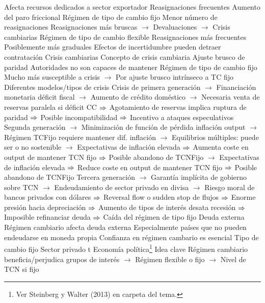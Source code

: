 \documentclass{nuevotema}
\begin{document}
\begin{esquemal}
				\4[] Afecta recursos dedicados a sector exportador
				\4 Reasignaciones frecuentes
				\4[] Aumento del paro friccional
				\4 Régimen de tipo de cambio fijo
				\4[] Menor número de reasignaciones
				\4[] Reasignaciones más bruscas
				\4[] $\to$ Devaluaciones
				\4[] $\to$ Crisis cambiarias
				\4 Régimen de tipo de cambio flexible
				\4[] Reasignaciones más frecuentes
				\4[] Posiblemente más graduales
				\4[] Efectos de incertidumbre pueden detraer contratación
			\3 Crisis cambiarias
				\4 Concepto de crisis cambiaria
				\4[] Ajuste brusco de paridad
				\4[] Autoridades no son capaces de mantener
				\4 Régimen de tipo de cambio fijo
				\4[] Mucho más susceptible a crisis
				\4[] $\to$ Por ajuste brusco intrínseco a TC fijo
				\4 Diferentes modelos/tipos de crisis
				\4[] Crisis de primera generación
				\4[] $\to$ Financiación monetaria déficit fiscal
				\4[] $\to$ Aumento de crédito doméstico
				\4[] $\to$ Necesaria venta de reservas paralela si déficit CC
				\4[] $\Rightarrow$ Agotamiento de reservas implica ruptura de paridad
				\4[] $\Rightarrow$ Posible incompatibilidad
				\4[] $\Rightarrow$ Incentivo a ataques especulativos
				\4[] Segunda generación
				\4[] $\to$ Minimización de función de pérdida inflación output
				\4[] $\to$ Régimen TCFijo requiere mantener dif. inflación
				\4[] $\to$ Equilibrios múltiples: puede ser o no sostenible
				\4[] $\to$ Expectativas de inflación elevada
				\4[] $\Rightarrow$ Aumenta coste en output de mantener TCN fijo
				\4[] $\Rightarrow$ Posible abandono de TCNFijo
				\4[] $\to$ Expectativas de inflación elevada
				\4[] $\Rightarrow$ Reduce coste en output de mantener TCN fijo
				\4[] $\Rightarrow$ Posible abandono de TCNFijo
				\4[] Tercera generación
				\4[] $\to$ Garantía implícita de gobierno sobre TCN
				\4[] $\to$ Endeudamiento de sector privado en divisa
				\4[] $\to$ Riesgo moral de bancos privados con dólares
				\4[] $\Rightarrow$ Reversal flow o sudden stop de flujos
				\4[] $\Rightarrow$ Enorme presión hacia depreciación
				\4[] $\Rightarrow$ Aumento de tipos de interés desata recesión
				\4[] $\Rightarrow$ Imposible refinanciar deuda
				\4[] $\Rightarrow$ Caída del régimen de tipo fijo
			\3 Deuda externa
				\4 Régimen cambiario afecta deuda externa
				\4[] Especialmente países que no pueden endeudarse en moneda propia
				\4 Confianza en régimen cambario es esencial
				\4 Tipo de cambio fijo
				\4[] Sector privado t
			\3 Economía política\footnote{Ver Steinberg y Walter (2013) en carpeta del tema.}
				\4 Idea clave
				\4[] Régimen cambiario beneficia/perjudica grupos de interés
				\4[] $\to$ Régimen flexible o fijo
				\4[] $\to$ Nivel de TCN si fijo

\end{esquemal}
\end{document}
